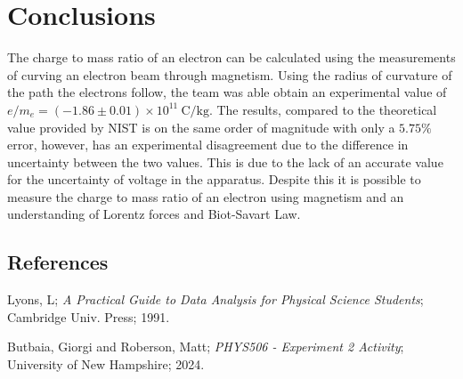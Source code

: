 \documentclass[prX,nofootinbib,notitlepage]{revtex4-1}
\begin{document}
\section{Conclusions}
The charge to mass ratio of an electron can be calculated using the measurements of curving an electron beam through magnetism. Using the radius of curvature of the path the electrons follow, the team was able obtain an experimental value of $e/m_{e} = (-1.86 \pm 0.01) \times 10^{11} ~ \text{C/kg}$. The results, compared to the theoretical value provided by NIST is on the same order of magnitude with only a $5.75\%$ error, however, has an experimental disagreement due to the difference in uncertainty between the two values. This is due to the lack of an accurate value for the uncertainty of voltage in the apparatus. Despite this it is possible to measure the charge to mass ratio of an electron using magnetism and an understanding of Lorentz forces and Biot-Savart Law. 

\begin{thebibliography}{99}

\section{References}

Lyons, L;
\textit{A Practical Guide to Data Analysis for Physical Science Students};
Cambridge Univ. Press; 1991.

Butbaia, Giorgi and Roberson, Matt;
\textit{PHYS506 - Experiment 2 Activity};
University of New Hampshire; 2024.

\end{thebibliography}

\end{document}
